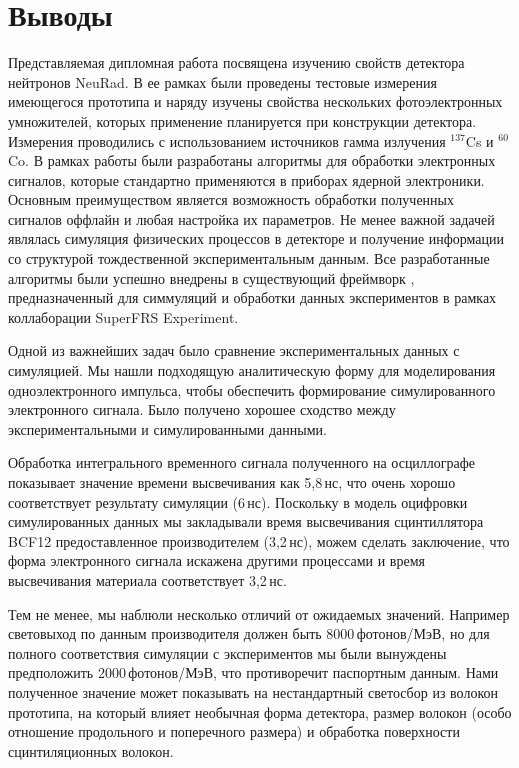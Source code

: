 \section{Выводы}

Представляемая дипломная работа посвящена изучению свойств детектора нейтронов NeuRad. В ее рамках были проведены тестовые измерения имеющегося прототипа и наряду изучены свойства нескольких фотоэлектронных умножителей, которых применение планируется при конструкции детектора.
%
Измерения проводились с использованием источников гамма излучения $^{137}$Cs и $^{60}$Co.
В рамках работы были разработаны алгоритмы для обработки электронных сигналов, которые стандартно применяются в приборах ядерной электроники. Основным преимуществом является возможность обработки полученных сигналов оффлайн и любая настройка их параметров.
Не менее важной задачей являлась симуляция физических процессов в детекторе и получение информации со структурой тождественной экспериментальным данным.
%
Все разработанные алгоритмы были успешно внедрены в существующий фреймворк \er, предназначенный для симмуляций и обработки данных экспериментов в рамках коллаборации SuperFRS Experiment.

Одной из важнейших задач было сравнение экспериментальных данных с симуляцией. 
Мы нашли подходящую аналитическую форму для моделирования одноэлектронного импульса, чтобы обеспечить формирование симулированного электронного сигнала. Было получено хорошее сходство между экспериментальными и симулированными данными.

Обработка интегрального временного сигнала полученного на осциллографе показывает значение времени высвечивания как 5,8\,нс, что очень хорошо соответствует результату симуляции (6\,нс). Поскольку в модель оцифровки симулированных данных мы закладывали время высвечивания сцинтиллятора BCF12 предоставленное производителем (3,2\,нс), можем сделать заключение, что форма электронного сигнала искажена другими процессами и время высвечивания материала соответствует 3,2\,нс.

Тем не менее, мы наблюли несколько отличий от ожидаемых значений. Например световыход по данным производителя должен быть 8000\,фотонов/МэВ, но для полного соответствия симуляции с экспериментов мы были вынуждены предположить 2000\,фотонов/МэВ, что противоречит паспортным данным. Нами полученное значение может показывать на нестандартный светосбор из волокон прототипа, на который влияет необычная форма детектора, размер волокон (особо отношение продольного и поперечного размера) и обработка поверхности сцинтиляционных волокон.

